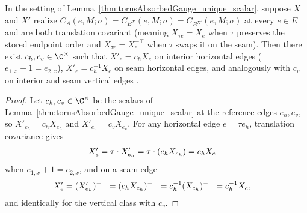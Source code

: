 \begin{lemma}%
    \label{thm:torusCovariantAbsorbedGauge_unique_classScalar}
    \leanok
    In the setting of Lemma~\ref{thm:torusAbsorbedGauge_unique_scalar},
    suppose $X$ and $X'$ realize $C_A(e,M;\sigma)=C_{B^X}(e,M;\sigma)=C_{B^{X'}}(e,M;\sigma)$
    at every $e\in E$ and are both translation covariant (meaning $X_{\tau e}=X_e$
    when $\tau$ preserves the stored endpoint order and $X_{\tau e}=X_e^{-\top}$
    when $\tau$ swaps it on the seam). Then there exist $c_h,c_v\in\C^\times$
    such that $X'_e=c_h X_e$ on interior horizontal edges ($e_{1,x}+1=e_{2,x}$),
    $X'_e=c_h^{-1}X_e$ on seam horizontal edges, and analogously with $c_v$ on
    interior and seam vertical edges \cite[Theorem~3]{Molnar2018NormalPEPS}.
    \begin{proof}
        \leanok
        Let $c_h,c_v\in\C^\times$ be the scalars of
        Lemma~\ref{thm:torusAbsorbedGauge_unique_scalar} at the reference
        edges $e_h,e_v$, so $X'_{e_h}=c_h X_{e_h}$ and $X'_{e_v}=c_v X_{e_v}$.
        For any horizontal edge $e=\tau e_h$, translation covariance gives
        \begin{align}
            X'_e
             & =\tau\cdot X'_{e_h}
            =\tau\cdot(c_h X_{e_h})
            =c_h X_e
            \notag
        \end{align}
        when $e_{1,x}+1=e_{2,x}$, and on a seam edge
        \begin{align}
            X'_e
             & =(X'_{e_h})^{-\top}
            =(c_h X_{e_h})^{-\top}
            =c_h^{-1}(X_{e_h})^{-\top}
            =c_h^{-1}X_e,
            \notag
        \end{align}
        and identically for the vertical class with $c_v$.
    \end{proof}
\end{lemma}

